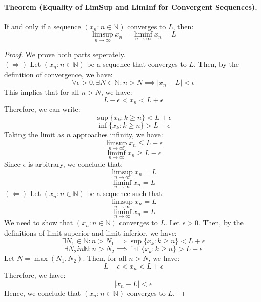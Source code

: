 \documentclass[openany]{book}
\numberwithin{equation}{section}
\begin{document}
\paragraph{Theorem (Equality of LimSup and LimInf for Convergent Sequences).}

    If and only if a sequence $(x_n : n \in \mathbb{N})$ converges to $L$, then:
    $$\limsup_{n \to \infty} x_n = \liminf_{n \to \infty} x_n = L$$
\par
\begin{proof}
    We prove both parts seperately. \\
    $(\Rightarrow)$ Let $(x_n : n \in \mathbb{N})$ be a sequence that converges to $L$. Then, by the definition of convergence, we have:
    $$\forall \epsilon > 0, \exists N \in \mathbb{N}: n > N \implies |x_n - L| < \epsilon$$
    This implies that for all $n > N$, we have:
    $$L - \epsilon < x_n < L + \epsilon$$
    Therefore, we can write:
    $$\sup\{x_k : k \geq n\} < L + \epsilon$$
    $$\inf\{x_k : k \geq n\} > L - \epsilon$$
    Taking the limit as $n$ approaches infinity, we have:
    $$\limsup_{n \to \infty} x_n \leq L + \epsilon$$
    $$\liminf_{n \to \infty} x_n \geq L - \epsilon$$
    Since $\epsilon$ is arbitrary, we conclude that:
    $$\limsup_{n \to \infty} x_n = L$$
    $$\liminf_{n \to \infty} x_n = L$$
    $(\Leftarrow)$ Let $(x_n : n \in \mathbb{N})$ be a sequence such that:
    $$\limsup_{n \to \infty} x_n = L$$
    $$\liminf_{n \to \infty} x_n = L$$
    We need to show that $(x_n : n \in \mathbb{N})$ converges to $L$. Let $\epsilon > 0$. Then, by the definitions of limit superior and limit inferior, we have:
    $$\exists N_1 \in \mathbb{N}: n > N_1 \implies \sup\{x_k : k \geq n\} < L + \epsilon$$
    $$\exists N_2 in \mathbb{N}: n > N_2 \implies \inf\{x_k : k \geq n\} > L - \epsilon$$
    Let $N = \max(N_1, N_2)$. Then, for all $n > N$, we have:
    $$L - \epsilon < x_n < L + \epsilon$$
    Therefore, we have:
    $$|x_n - L| < \epsilon$$
    Hence, we conclude that $(x_n : n \in \mathbb{N})$ converges to $L$.
\end{proof}
\end{document}

